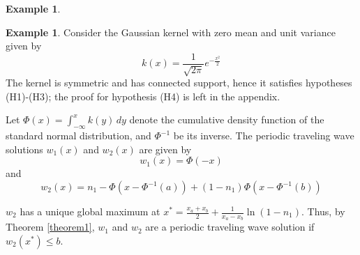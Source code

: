 \documentclass[11pt]{article}
\theoremstyle{definition}
\newtheorem{ex}[thm]{Example}
\numberwithin{equation}{section}
\numberwithin{thm}{section}
\renewcommand{\a}{a}
\renewcommand{\b}{b}
\newcommand{\m}{n_1}
\begin{document}
\begin{ex}
%
%
%
%
%
%
%
%
%
%
%
%
%
%
%

\end{ex}

\begin{ex} Consider the Gaussian kernel with zero mean and unit variance given by
$$ k(x) = \frac{1}{\sqrt{2\pi}} e^{-\frac{x^2}{2}} $$
The kernel is symmetric and has connected support, hence it satisfies hypotheses (H1)-(H3); the proof for hypothesis (H4) is left in the appendix.

Let $\Phi(x)=\int_{-\infty}^{x}k(y)\,dy$ denote the cumulative density function of the standard normal distribution, and $\Phi^{-1}$ be its inverse. The periodic traveling wave solutions $w_1(x)$ and $w_2(x)$ are given by
\begin{equation}
w_1(x) = \Phi(-x)
\end{equation}
and
\begin{equation}
w_2(x)=  \m - \Phi(x-\Phi^{-1}(\a)) + (1-\m)\Phi(x-\Phi^{-1}(\b))
\end{equation}

$w_2$ has a unique global maximum at $x^*=\frac{x_\a+x_\b}{2} + \frac{1}{x_\a-x_\b}\ln\left(1-\m\right)$. Thus, by Theorem \ref{theorem1}, $w_1$ and $w_2$ are a periodic traveling wave solution if $w_2(x^*)\leq \b$.
\end{ex}
\end{document}
